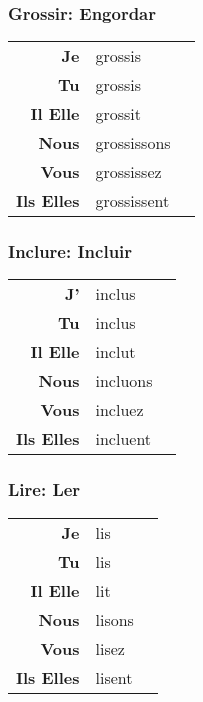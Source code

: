 \documentclass{subfiles}
\begin{document}
\begin{multicols}{3}
        \subsubsection{Grossir: Engordar}
            \begin{tabular}{r l r}
                \textbf{Je}        & grossis     &\\
                \textbf{Tu}        & grossis     &\\
                \textbf{Il Elle}   & grossit     &\\
                \textbf{Nous}      & grossissons &\\
                \textbf{Vous}      & grossissez  &\\
                \textbf{Ils Elles} & grossissent &
            \end{tabular}

        \subsubsection{Inclure: Incluir}
            \begin{tabular}{r l r}
                \textbf{J'}        & inclus   &\\
                \textbf{Tu}        & inclus   &\\
                \textbf{Il Elle}   & inclut   &\\
                \textbf{Nous}      & incluons &\\
                \textbf{Vous}      & incluez  &\\
                \textbf{Ils Elles} & incluent &
            \end{tabular}

        \subsubsection{Lire: Ler}
            \begin{tabular}{r l r}
                \textbf{Je}        & lis    &\\
                \textbf{Tu}        & lis    &\\
                \textbf{Il Elle}   & lit    &\\
                \textbf{Nous}      & lisons &\\
                \textbf{Vous}      & lisez  &\\
                \textbf{Ils Elles} & lisent &
            \end{tabular}


\end{multicols}
\end{document}
